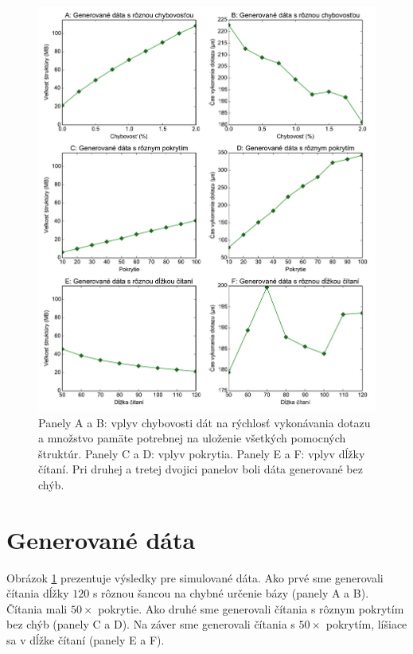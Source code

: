 \begin{figure}

\centerline{\includegraphics[width=1\textwidth]{images/chart_artificial.pdf}}

\caption[Simulované dáta]{Panely A a B: vplyv chybovosti dát na rýchlosť vykonávania dotazu a množstvo
pamäte potrebnej na uloženie všetkých pomocných štruktúr. Panely C a D: vplyv pokrytia.
Panely E a F: vplyv dĺžky čítaní. Pri druhej a tretej dvojici panelov boli dáta generované
bez chýb.}

\label{chart:artificial}

\end{figure}

\section{Generované dáta}

Obrázok \ref{chart:artificial} prezentuje výsledky pre simulované dáta. Ako prvé sme
generovali čítania dĺžky $120$ s rôznou šancou na chybné určenie bázy (panely A a B). Čítania mali
$50\times$ pokrytie. Ako druhé sme generovali čítania s rôznym pokrytím bez chýb (panely C a D).
Na záver sme generovali čítania s $50\times$ pokrytím, líšiace sa v dĺžke
čítaní (panely E a F).

